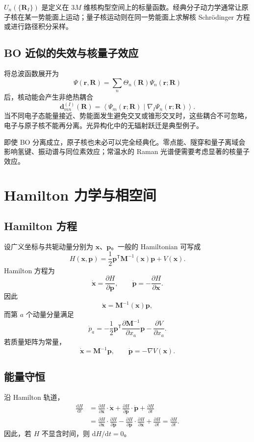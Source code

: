 \documentclass[11pt,a4paper,oneside,openany,fontset=fandol]{ctexbook}
\newcommand{\dd}{\mathrm{d}}
\newcommand{\vct}[1]{\bm{#1}}
\newcommand{\mat}[1]{\mathbf{#1}}
\begin{document}
\begin{remarkbox}[势能面的含义]
$U_n(\{\vct R_I\})$ 是定义在 $3M$ 维核构型空间上的标量函数。经典分子动力学通常让原子核在某一势能面上运动；量子核运动则在同一势能面上求解核 Schrödinger 方程或进行路径积分采样。
\end{remarkbox}

\section{BO 近似的失效与核量子效应}

将总波函数展开为
\[
\Psi(\vct r,\vct R)
=
\sum_n\Theta_n(\vct R)\Psi_n(\vct r;\vct R)
\]
后，核动能会产生非绝热耦合
\[
\vct d_{mn}^{(I)}(\vct R)
=
\left\langle
\Psi_m(\vct r;\vct R)
\middle|
\nabla_I
\Psi_n(\vct r;\vct R)
\right\rangle .
\]
当不同电子态能量接近、势能面发生避免交叉或锥形交叉时，这些耦合不可忽略，电子与原子核不能再分离。光异构化中的无辐射跃迁是典型例子。

即使 BO 分离成立，原子核也未必可以完全经典化。零点能、隧穿和量子离域会影响氢键、振动谱与同位素效应；常温水的 Raman 光谱便需要考虑显著的核量子效应。

\chapter{Hamilton 力学与相空间}

\section{Hamilton 方程}

设广义坐标与共轭动量分别为 $\vct x$、$\vct p$。一般的 Hamiltonian 可写成
\[
H(\vct x,\vct p)
=
\frac12\vct p^{\mathsf T}\mat M^{-1}(\vct x)\vct p
+V(\vct x).
\]
Hamilton 方程为
\[
\dot{\vct x}=\frac{\partial H}{\partial\vct p},
\qquad
\dot{\vct p}=-\frac{\partial H}{\partial\vct x}.
\]
因此
\[
\dot{\vct x}=\mat M^{-1}(\vct x)\vct p,
\]
而第 $a$ 个动量分量满足
\[
\dot p_a
=
-\frac12\vct p^{\mathsf T}
\frac{\partial\mat M^{-1}}{\partial x_a}
\vct p
-\frac{\partial V}{\partial x_a}.
\]
若质量矩阵为常量，
\[
\dot{\vct x}=\mat M^{-1}\vct p,
\qquad
\dot{\vct p}=-\nabla V(\vct x).
\]

\section{能量守恒}

沿 Hamilton 轨道，
\begin{align}
\frac{\dd H}{\dd t}
&=
\frac{\partial H}{\partial\vct x}\cdot\dot{\vct x}
+
\frac{\partial H}{\partial\vct p}\cdot\dot{\vct p}
+
\frac{\partial H}{\partial t}\\
&=
\frac{\partial H}{\partial\vct x}\cdot
\frac{\partial H}{\partial\vct p}
-
\frac{\partial H}{\partial\vct p}\cdot
\frac{\partial H}{\partial\vct x}
+
\frac{\partial H}{\partial t}
=
\frac{\partial H}{\partial t}.
\end{align}
因此，若 $H$ 不显含时间，则 $\dd H/\dd t=0$。
\end{document}
